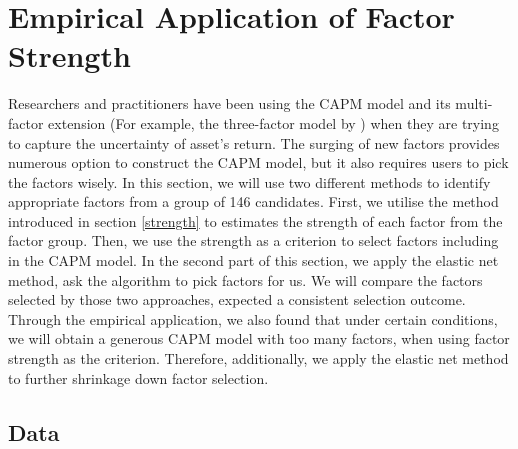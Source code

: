 




%
	\section{Empirical Application of Factor Strength}\label{Empirical:factor_strength}
	
Researchers and practitioners have been using the CAPM model \cite{Sharpe1964, Lintner1965, Black1972} and its multi-factor extension (For example, the three-factor model by ) when they are trying to capture the uncertainty of asset's return.
The surging of new factors \cite{Harvey2019} provides numerous option to construct the CAPM model, but it also requires users to pick the factors wisely.
In this section, we will use two different methods to identify appropriate factors from a group of 146 candidates.
First, we utilise the method introduced in section \ref{strength} to estimates the strength of each factor from the factor group.
Then, we use the strength as a criterion to select factors including in the CAPM model.
In the second part of this section, we apply the elastic net method, ask the algorithm to pick factors for us.
We will compare the factors selected by those two approaches, expected a consistent selection outcome.
Through the empirical application, we also found that under certain conditions, we will obtain a generous CAPM model with too many factors, when using factor strength as the criterion.
Therefore, additionally, we apply the elastic net method to further shrinkage down factor selection.
	\subsection{Data}\label{data}
	
